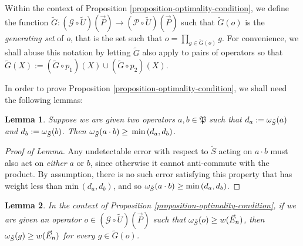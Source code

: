 \documentclass[twocolumn,showpacs,preprintnumbers,amsmath,amssymb,nofootinbib,pra,floatfix]{revtex4-1}
\newtheorem{lemma}{Lemma}
\newenvironment{definition}[1][Definition]{\begin{trivlist}
\item[\hskip \labelsep {\bfseries #1}]}{\end{trivlist}}
\newcommand{\lst}{\vec}
\newcommand{\set}{\tilde}
\newcommand{\genfun}{\mathcal{G}}
\newcommand{\pauligroup}{\mathfrak{P}}
\newcommand{\powerset}{\mathcal{P}}
\begin{document}
\begin{definition}
Within the context of Proposition \ref{proposition-optimality-condition}, we define the function $\set G:(\genfun\circ\set U)(\lst P)\to(\powerset\circ\set U)(\lst P)$ such that $\set G(o)$ is the \emph{generating set} of $o$, that is the set such that $o=\prod_{g\in\set G(o)} g$.  For convenience, we shall abuse this notation by letting $\set G$ also apply to pairs of operators so that $\set G(X):=(\set G\circ p_1)(X)\cup(\set G\circ p_2)(X).$
\end{definition}
In order to prove Proposition \ref{proposition-optimality-condition}, we shall need the following lemmas:
\begin{lemma}
Suppose we are given two operators $a,b\in\pauligroup$ such that $d_a:=\om_{\set S}(a)$ and $d_b:=\om_{\set S}(b)$.  Then $\om_{\set S}(a\cdot b) \ge \text{\min}\,(d_a,d_b)$.
\end{lemma}

\begin{proof}[Proof of Lemma]
Any undetectable error with respect to $\set S$ acting on $a\cdot b$ must also act on \emph{either} $a$ or $b$, since otherwise it cannot anti-commute with the product.  By assumption, there is no such error satisfying this property that has weight less than $\text{min}\,(d_a,d_b)$, and so $\om_{\set S}(a\cdot b) \ge \text{min}\,(d_a,d_b)$.
\end{proof}
\begin{lemma}
In the context of Proposition \ref{proposition-optimality-condition}, if we are given an operator $o\in (\genfun\circ\set U)(\lst P)$ such that $\om_{\set S}(o)\ge w(\lst E_n)$, then $\om_{\set S}(g)\ge w(\lst E_n)$ for every $g\in\set G(o)$.
\end{lemma}
\end{document}
